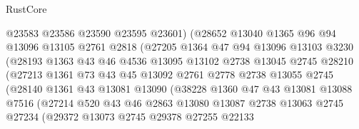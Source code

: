 \begin{lexlean}{RustCore}
\begin{coremodule}
                        @23583
                        @23586
                        @23590
                        @23595
                        @23601)
                      (@28652
                        @13040
                        @1365
                        @96
                        @94
                        @13096
                        @13105
                        @2761
                        @2818
                        (@27205
                          @1364
                          @47
                          @94
                          @13096
                          @13103
                          @3230
                          (@28193
                            @1363
                            @43
                            @46
                            @4536
                            @13095
                            @13102
                            @2738
                            @13045
                            @2745
                            @28210
                            (@27213
                              @1361
                              @73
                              @43
                              @45
                              @13092
                              @2761
                              @2778
                              @2738
                              @13055
                              @2745
                              (@28140
                                @1361
                                @43
                                @13081
                                @13090
                                (@38228
                                  @1360
                                  @47
                                  @43
                                  @13081
                                  @13088
                                  @7516
                                  (@27214
                                    @520
                                    @43
                                    @46
                                    @2863
                                    @13080
                                    @13087
                                    @2738
                                    @13063
                                    @2745
                                    @27234
                                    (@29372
                                      @13073
                                      @2745
                                      @29378
                                      @27255
                                      @22133

\end{coremodule}
\end{lexlean}
